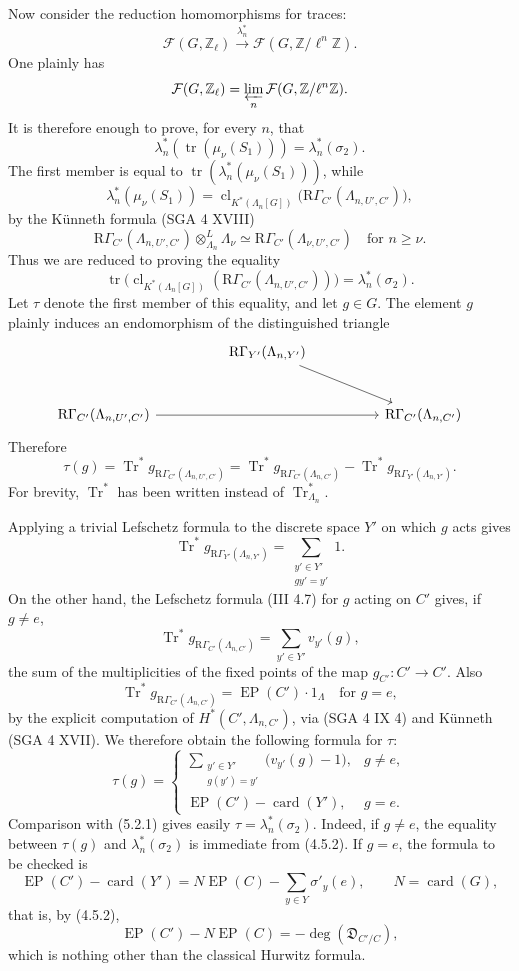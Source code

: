 \documentclass[11pt]{article}
\providecommand{\Tr}{\operatorname{Tr}}
\providecommand{\EP}{\operatorname{EP}}
\providecommand{\Tr}{\operatorname{Tr}}
\providecommand{\Tr}{\operatorname{Tr}}
\providecommand{\Tr}{\operatorname{Tr}}
\providecommand{\EP}{\operatorname{EP}}
\providecommand{\clKstar}[1]{\operatorname{cl}_{K^*(#1)}}
\providecommand{\RG}{\mathrm R\Gamma}
\begin{document}
Now consider the reduction homomorphisms for traces:
\[
\mathcal F(G,\mathbb Z_\ell)\xrightarrow{\lambda_n^*}\mathcal F(G,\mathbb Z/\ell^n\mathbb Z).
\]
One plainly has
\[
\mathcal F(G,\mathbb Z_\ell)=\varprojlim_n\mathcal F(G,\mathbb Z/\ell^n\mathbb Z).
\]
It is therefore enough to prove, for every $n$, that
\[
\lambda_n^*(\operatorname{tr}(\mu_\nu(S_1)))=\lambda_n^*(\sigma_2).
\]
The first member is equal to $\operatorname{tr}(\lambda_n^*(\mu_\nu(S_1)))$, while
\[
\lambda_n^*(\mu_\nu(S_1))
=
\clKstar{\Lambda_n[G]}\bigl(\RG_{C'}(\Lambda_{n,U',C'})\bigr),
\]
by the Künneth formula (SGA 4 XVIII)
\[
\RG_{C'}(\Lambda_{n,U',C'})\otimes_{\Lambda_n}^{L}\Lambda_\nu
\simeq \RG_{C'}(\Lambda_{\nu,U',C'})
\quad\text{for } n\ge\nu.
\]
Thus we are reduced to proving the equality
\[
\operatorname{tr}\bigl(\clKstar{\Lambda_n[G]}(\RG_{C'}(\Lambda_{n,U',C'}))\bigr)
=
\lambda_n^*(\sigma_2).
\]
Let $\tau$ denote the first member of this equality, and let $g\in G$. The element $g$ plainly induces an endomorphism of the distinguished triangle
\[
\begin{tikzcd}[column sep=huge,row sep=large]
& \RG_{Y'}(\Lambda_{n,Y'}) \arrow[dr] & \\
\RG_{C'}(\Lambda_{n,U',C'}) \arrow[rr] && \RG_{C'}(\Lambda_{n,C'})
\end{tikzcd}
\]
Therefore
\[
\tau(g)=\Tr^*g_{\RG_{C'}(\Lambda_{n,U',C'})}
=\Tr^*g_{\RG_{C'}(\Lambda_{n,C'})}
-\Tr^*g_{\RG_{Y'}(\Lambda_{n,Y'})}.
\]
For brevity, $\Tr^*$ has been written instead of $\Tr^*_{\Lambda_n}$.

Applying a trivial Lefschetz formula to the discrete space $Y'$ on which $g$ acts gives
\[
\Tr^*g_{\RG_{Y'}(\Lambda_{n,Y'})}
=
\sum_{\substack{y'\in Y'\\gy'=y'}}1.
\]
On the other hand, the Lefschetz formula (III 4.7) for $g$ acting on $C'$ gives, if $g\ne e$,
\[
\Tr^*g_{\RG_{C'}(\Lambda_{n,C'})}
=
\sum_{y'\in Y'} v_{y'}(g),
\]
the sum of the multiplicities of the fixed points of the map $g_{C'}:C'\to C'$. Also
\[
\Tr^*g_{\RG_{C'}(\Lambda_{n,C'})}=\EP(C')\cdot1_\Lambda
\quad\text{for }g=e,
\]
by the explicit computation of $H^*(C',\Lambda_{n,C'})$, via (SGA 4 IX 4) and Künneth (SGA 4 XVII). We therefore obtain the following formula for $\tau$:
\[
\tau(g)=
\begin{cases}
\displaystyle\sum_{\substack{y'\in Y'\\g(y')=y'}}\bigl(v_{y'}(g)-1\bigr),& g\ne e,\\[0.8em]
\EP(C')-\operatorname{card}(Y'),& g=e.
\end{cases}
\tag{5.2.2}
\]
Comparison with (5.2.1) gives easily $\tau=\lambda_n^*(\sigma_2)$. Indeed, if $g\ne e$, the equality between $\tau(g)$ and $\lambda_n^*(\sigma_2)$ is immediate from (4.5.2). If $g=e$, the formula to be checked is
\[
\EP(C')-\operatorname{card}(Y')
=
N\EP(C)-\sum_{y\in Y}\sigma'_y(e),
\qquad N=\operatorname{card}(G),
\]
that is, by (4.5.2),
\[
\EP(C')-N\EP(C)=-\deg(\mathfrak D_{C'/C}),
\]
which is nothing other than the classical Hurwitz formula.
\end{document}
